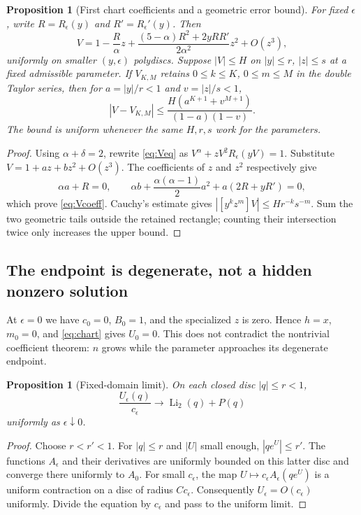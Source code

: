 \documentclass[11pt,a4paper]{article}
\numberwithin{equation}{section}
\newtheorem{proposition}[theorem]{Proposition}
\theoremstyle{definition}
\theoremstyle{remark}
\newcommand{\ee}{\epsilon}
\DeclareMathOperator{\Li}{Li}
\begin{document}
\begin{proposition}[First chart coefficients and a geometric error bound]
\label{prop:chartcoeff}
For fixed $\ee$, write $R=R_\ee(y)$ and $R'=R_\ee'(y)$. Then
\begin{equation}\label{eq:Vcoeff}
 V=1-\frac{R}{\alpha}z+
 \frac{(5-\alpha)R^2+2yRR'}{2\alpha^2}z^2+O(z^3),
\end{equation}
uniformly on smaller $(y,\ee)$ polydiscs. Suppose $|V|\le H$ on
$|y|\le r$, $|z|\le s$ at a fixed admissible parameter. If $V_{K,M}$
retains $0\le k\le K$, $0\le m\le M$ in the double Taylor series, then
for $a=|y|/r<1$ and $v=|z|/s<1$,
\begin{equation}\label{eq:chartbound}
 |V-V_{K,M}|
 \le \frac{H(a^{K+1}+v^{M+1})}{(1-a)(1-v)}.
\end{equation}
The bound is uniform whenever the same $H,r,s$ work for the parameters.
\end{proposition}
\begin{proof}
Using $\alpha+\delta=2$, rewrite \eqref{eq:Veq} as
$V^\alpha+zV^2R_\ee(yV)=1$. Substitute $V=1+az+bz^2+O(z^3)$.
The coefficients of $z$ and $z^2$ respectively give
\[
 \alpha a+R=0,\qquad
 \alpha b+\frac{\alpha(\alpha-1)}2a^2+a(2R+yR')=0,
\]
which prove \eqref{eq:Vcoeff}. Cauchy's estimate gives
$|[y^kz^m]V|\le Hr^{-k}s^{-m}$. Sum the two geometric tails outside the
retained rectangle; counting their intersection twice only increases the
upper bound.
\end{proof}

\subsection{The endpoint is degenerate, not a hidden nonzero solution}
At $\ee=0$ we have $c_0=0$, $B_0=1$, and the specialized $z$ is zero.
Hence $h=x$, $m_0=0$, and \eqref{eq:chart} gives $U_0=0$. This does not
contradict the nontrivial coefficient theorem: $n$ grows while the parameter
approaches its degenerate endpoint.

\begin{proposition}[Fixed-domain limit]\label{prop:fixedq}
On each closed disc $|q|\le r<1$,
\begin{equation}\label{eq:fixedq}
 \frac{U_\ee(q)}{c_\ee}\longrightarrow\Li_2(q)+P(q)
\end{equation}
uniformly as $\ee\downarrow0$.
\end{proposition}
\begin{proof}
Choose $r<r'<1$. For $|q|\le r$ and $|U|$ small enough,
$|qe^U|\le r'$. The functions $A_\ee$ and their derivatives are uniformly
bounded on this latter disc and converge there uniformly to $A_0$.
For small $c_\ee$, the map $U\mapsto c_\ee A_\ee(qe^U)$ is a uniform
contraction on a disc of radius $C c_\ee$. Consequently $U_\ee=O(c_\ee)$
uniformly. Divide the equation by $c_\ee$ and pass to the uniform limit.
\end{proof}
\end{document}
